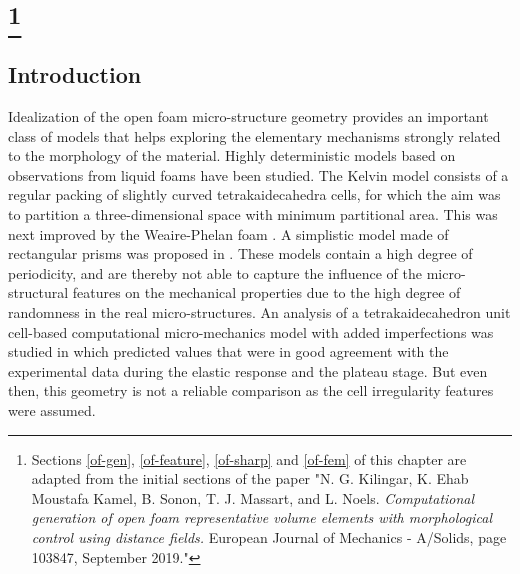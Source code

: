 \captionsetup[subfigure]{labelfont=bf,textfont=normalfont,font=footnotesize}
\makeatletter
\newtheorem{thm}{\protect\theoremname}
\makeatother
\providecommand{\theoremname}{Theorem}
\providecommand{\keywords}[1]{\textbf{\textit{Index terms---}} #1}
\chapter[\titleof]{\titleof\footnote{Sections \ref{of-gen}, \ref{of-feature}, \ref{of-sharp} and \ref{of-fem} of this chapter are adapted from the initial sections of the paper "N. G. Kilingar, K. Ehab Moustafa Kamel, B. Sonon, T. J. Massart, and L. Noels.	\textit{Computational generation of open foam representative volume elements with morphological control using distance fields.} European Journal of Mechanics - A/Solids, page 103847, September 2019."}}\label{chap-of}


\section{Introduction}

Idealization of the open foam micro-structure geometry provides an important class of models that helps exploring the elementary mechanisms strongly related to the morphology of the material. Highly deterministic models based on observations from liquid foams have been studied. The Kelvin model \cite{thomsonLXIIIDivisionSpace1887} consists of a regular packing of slightly curved tetrakaidecahedra cells, for which the aim was to partition a three-dimensional space with minimum partitional area. This was next improved by the Weaire-Phelan foam \cite{weaireCounterexampleKelvinConjecture1994}. A simplistic model made of rectangular prisms was proposed in \cite{gibsonCellularSolidsStructure1997}. These models contain a high degree of periodicity, and are thereby not able to capture the influence of the micro-structural features on the mechanical properties due to the high degree of randomness in the real micro-structures. An analysis of a tetrakaidecahedron unit cell-based computational micro-mechanics model with added imperfections was studied in \cite{wanExperimentalComputationalMicromechanical2015} which predicted values that were in good agreement with the experimental data during the elastic response and the plateau stage. But even then, this geometry is not a reliable comparison as the cell irregularity features were assumed.

